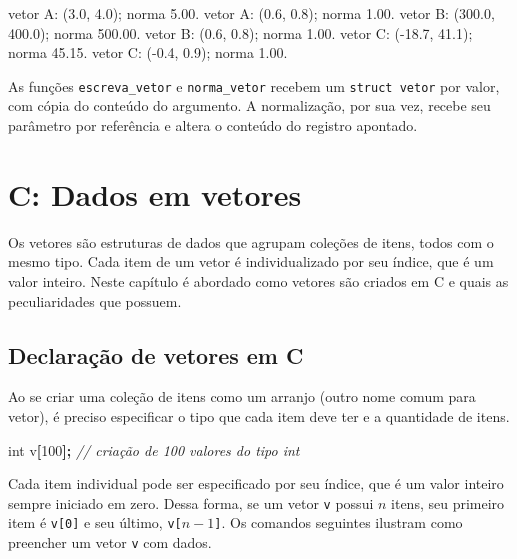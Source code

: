 \documentclass[
  11pt,
  a4paper,
]{scrbook}
\newenvironment{Shaded}{\begin{snugshade}}{\end{snugshade}}
\newcommand{\CommentTok}[1]{\textcolor[rgb]{0.56,0.35,0.01}{\textit{#1}}}
\newcommand{\DataTypeTok}[1]{\textcolor[rgb]{0.13,0.29,0.53}{#1}}
\newcommand{\DecValTok}[1]{\textcolor[rgb]{0.00,0.00,0.81}{#1}}
\newcommand{\NormalTok}[1]{#1}
\newcommand{\OperatorTok}[1]{\textcolor[rgb]{0.81,0.36,0.00}{\textbf{#1}}}
\begin{document}
\begin{Shaded}
\begin{Highlighting}[]
\NormalTok{vetor A: (3.0, 4.0); norma 5.00.}
\NormalTok{vetor A: (0.6, 0.8); norma 1.00.}
\NormalTok{vetor B: (300.0, 400.0); norma 500.00.}
\NormalTok{vetor B: (0.6, 0.8); norma 1.00.}
\NormalTok{vetor C: ({-}18.7, 41.1); norma 45.15.}
\NormalTok{vetor C: ({-}0.4, 0.9); norma 1.00.}
\end{Highlighting}
\end{Shaded}

As funções \texttt{escreva\_vetor} e \texttt{norma\_vetor} recebem um
\texttt{struct\ vetor} por valor, com cópia do conteúdo do argumento. A
normalização, por sua vez, recebe seu parâmetro por referência e altera
o conteúdo do registro apontado.

\chapter{C: Dados em vetores}\label{c-dados-em-vetores}

Os vetores são estruturas de dados que agrupam coleções de itens, todos
com o mesmo tipo. Cada item de um vetor é individualizado por seu
índice, que é um valor inteiro. Neste capítulo é abordado como vetores
são criados em C e quais as peculiaridades que possuem.

\section{Declaração de vetores em
C}\label{declarauxe7uxe3o-de-vetores-em-c}

Ao se criar uma coleção de itens como um arranjo (outro nome comum para
vetor), é preciso especificar o tipo que cada item deve ter e a
quantidade de itens.

\begin{Shaded}
\begin{Highlighting}[]
\DataTypeTok{int}\NormalTok{ v}\OperatorTok{[}\DecValTok{100}\OperatorTok{];}  \CommentTok{// criação de 100 valores do tipo int}
\end{Highlighting}
\end{Shaded}

Cada item individual pode ser especificado por seu índice, que é um
valor inteiro sempre iniciado em zero. Dessa forma, se um vetor
\texttt{v} possui \(n\) itens, seu primeiro item é \texttt{v{[}0{]}} e
seu último, \texttt{v{[}}\(n-1\)\texttt{{]}}. Os comandos seguintes
ilustram como preencher um vetor \texttt{v} com dados.
\end{document}
